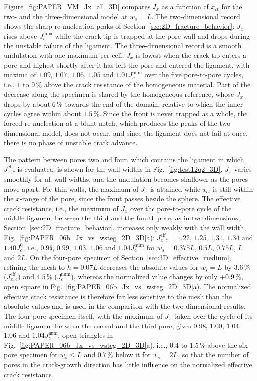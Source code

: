 \documentclass[pdflatex,sn-mathphys-num]{sn-jnl}%
\theoremstyle{thmstyleone}%
\theoremstyle{thmstyletwo}%
\theoremstyle{thmstylethree}%
\begin{document}
Figure~\ref{fig:PAPER_VM_Jx_all_3D} compares $J_x$ as a function of $x_{ct}$ for the two- and the three-dimensional model at $w_s = L$. The two-dimensional record shows the sharp re-nucleation peaks of Section~\ref{sec:2D_fracture_behavior}: $J_x$ rises above $J_c^{\text{num}}$ while the crack tip is trapped at the pore wall and drops during the unstable failure of the ligament. The three-dimensional record is a smooth undulation with one maximum per cell. $J_x$ is lowest when the crack tip enters a pore and highest shortly after it has left the pore and entered the ligament, with maxima of $1.09$, $1.07$, $1.06$, $1.05$ and $1.01J_c^{\text{num}}$ over the five pore-to-pore cycles, i.e., $1$ to $9\,\%$ above the crack resistance of the homogeneous material. Part of the decrease along the specimen is shared by the homogeneous reference, whose $J_x$ drops by about $6\,\%$ towards the end of the domain, relative to which the inner cycles agree within about $1.5\,\%$. Since the front is never trapped as a whole, the forced re-nucleation at a blunt notch, which produces the peaks of the two-dimensional model, does not occur, and since the ligament does not fail at once, there is no phase of unstable crack advance.

The pattern between pores two and four, which contains the ligament in which $J_{x,c}^{\text{eff}}$ is evaluated, is shown for the wall widths in Fig.~\ref{fig:test12q2_3D}. $J_x$ varies smoothly for all wall widths, and the undulation becomes shallower as the pores move apart. For thin walls, the maximum of $J_x$ is attained while $x_{ct}$ is still within the $x$-range of the pore, since the front passes beside the sphere. The effective crack resistance, i.e., the maximum of $J_x$ over the pore-to-pore cycle of the middle ligament between the third and the fourth pore, as in two dimensions, Section~\ref{sec:2D_fracture_behavior}, increases only weakly with the wall width, Fig.~\ref{fig:PAPER_06b_Jx_vs_wsteg_2D_3D}a): $J_{x,c}^{\text{eff}} = 1.22$, $1.25$, $1.31$, $1.34$ and $1.40J_c^0$, i.e., $0.96$, $0.99$, $1.03$, $1.06$ and $1.04J_c^{\text{num}}$ for $w_s = 0.375L$, $0.5L$, $0.75L$, $L$ and $2L$. On the four-pore specimen of Section~\ref{sec:3D_effective_medium}, refining the mesh to $h = 0.07L$ decreases the absolute values for $w_s = L$ by $3.6\,\%$ ($J_{x,c}^{\text{eff}}$) and $4.5\,\%$ ($J_c^{\text{num}}$), whereas the normalized value changes by only $+0.9\,\%$, open square in Fig.~\ref{fig:PAPER_06b_Jx_vs_wsteg_2D_3D}a). The normalized effective crack resistance is therefore far less sensitive to the mesh than the absolute values and is used in the comparison with the two-dimensional results. The four-pore specimen itself, with the maximum of $J_x$ taken over the cycle of its middle ligament between the second and the third pore, gives $0.98$, $1.00$, $1.04$, $1.06$ and $1.04J_c^{\text{num}}$, open triangles in Fig.~\ref{fig:PAPER_06b_Jx_vs_wsteg_2D_3D}a), i.e., $0.4$ to $1.5\,\%$ above the six-pore specimen for $w_s \le L$ and $0.7\,\%$ below it for $w_s = 2L$, so that the number of pores in the crack-growth direction has little influence on the normalized effective crack resistance.
\end{document}
